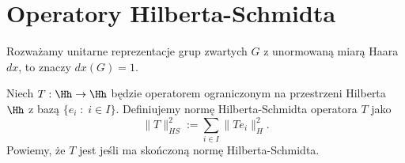 \section{Operatory Hilberta-Schmidta}

Rozważamy unitarne reprezentacje grup zwartych $G$ z unormowaną miarą Haara $dx$, to znaczy $dx(G)=1$.

%

Niech $T:\Hh\to\Hh$ będzie operatorem ograniczonym na przestrzeni Hilberta $\Hh$ z bazą $\{e_i\;:\;i\in I\}$. Definiujemy normę Hilberta-Schmidta operatora $T$ jako
$$\|T\|_{HS}^2:=\sum_{i\in I}\|Te_i\|_H^2.$$
Powiemy, że $T$ jest  jeśli ma skończoną normę Hilberta-Schmidta.

